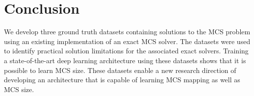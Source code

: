 \section{Conclusion}
We develop three ground truth datasets containing solutions to the MCS problem using an existing implementation of an exact MCS solver. The datasets were used to identify practical solution limitations for the associated exact solvers. Training a state-of-the-art deep learning architecture using these datasets shows that it is possible to learn MCS size. These datasets enable a new research direction of developing an architecture that is capable of learning MCS mapping as well as MCS size.